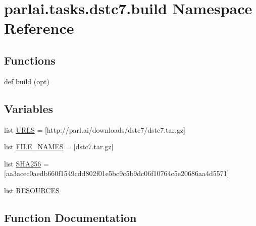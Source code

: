 \hypertarget{namespaceparlai_1_1tasks_1_1dstc7_1_1build}{}\section{parlai.\+tasks.\+dstc7.\+build Namespace Reference}
\label{namespaceparlai_1_1tasks_1_1dstc7_1_1build}
\subsection*{Functions}
\begin{DoxyCompactItemize}
\item 
def \hyperlink{namespaceparlai_1_1tasks_1_1dstc7_1_1build_a98e07e2cecdc25019b4d5eea7ea56e49}{build} (opt)
\end{DoxyCompactItemize}
\subsection*{Variables}
\begin{DoxyCompactItemize}
\item 
list \hyperlink{namespaceparlai_1_1tasks_1_1dstc7_1_1build_a4cbf3787ad68b1a3383bb9f2c35ead40}{U\+R\+LS} = \mbox{[}\textquotesingle{}http\+://parl.\+ai/downloads/dstc7/dstc7.\+tar.\+gz\textquotesingle{}\mbox{]}
\item 
list \hyperlink{namespaceparlai_1_1tasks_1_1dstc7_1_1build_a183a00284d72fff9b77c2968abdd4f0a}{F\+I\+L\+E\+\_\+\+N\+A\+M\+ES} = \mbox{[}\textquotesingle{}dstc7.\+tar.\+gz\textquotesingle{}\mbox{]}
\item 
list \hyperlink{namespaceparlai_1_1tasks_1_1dstc7_1_1build_a5c5b2722827737a3dbf5ca646754b3e8}{S\+H\+A256} = \mbox{[}\textquotesingle{}aa3acec0aedb660f1549cdd802f01e5bc9c5b9dc06f10764c5e20686aa4d5571\textquotesingle{}\mbox{]}
\item 
list \hyperlink{namespaceparlai_1_1tasks_1_1dstc7_1_1build_a55845a00d03206a66000322699e4dd1c}{R\+E\+S\+O\+U\+R\+C\+ES}
\end{DoxyCompactItemize}


\subsection{Function Documentation}
\mbox{\label{namespaceparlai_1_1tasks_1_1dstc7_1_1build_a98e07e2cecdc25019b4d5eea7ea56e49}} 
